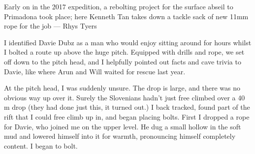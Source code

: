 \begin{marginfigure}
\centering
{}
\caption{Early on in the 2017 expedition, a rebolting project for the surface abseil to Primadona took place; here Kenneth Tan takes down a tackle sack of new 11mm rope for the job --- Rhys Tyers}
\label{teapot}
\end{marginfigure}


I identified Davie Dubz as a man who would enjoy sitting around for hours whilst I bolted a route up above the huge pitch. Equipped with drills and rope, we set off down to the pitch head, and I helpfully pointed out facts and cave trivia to Davie, like where Arun and Will waited for rescue last year.

At the pitch head, I was suddenly unsure. The drop is large, and there was no obvious way up over it. Surely the Slovenians hadn’t just free climbed over a 40 m drop (they had done just this, it turned out.) I back tracked, found part of the rift that I could free climb up in, and began placing bolts. First I dropped a rope for Davie, who joined me on the upper level. He dug a small hollow in the soft mud and lowered himself into it for warmth, pronouncing himself completely content. I began to bolt.

